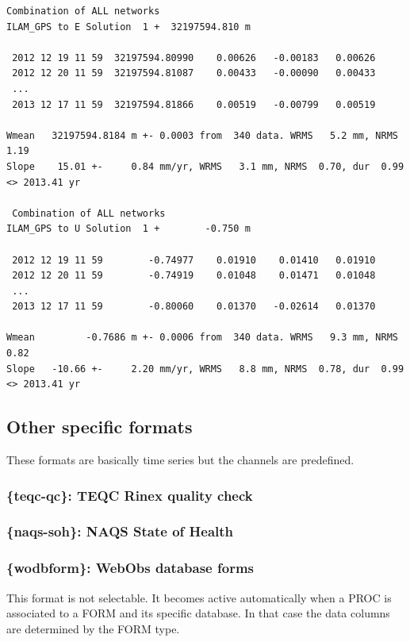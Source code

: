 \begin{lstlisting}[language={},title=GAMIT-GLOBK VAL format example]
 Combination of ALL networks
ILAM_GPS to E Solution  1 +  32197594.810 m

 2012 12 19 11 59  32197594.80990    0.00626   -0.00183   0.00626
 2012 12 20 11 59  32197594.81087    0.00433   -0.00090   0.00433
 ...
 2013 12 17 11 59  32197594.81866    0.00519   -0.00799   0.00519

Wmean   32197594.8184 m +- 0.0003 from  340 data. WRMS   5.2 mm, NRMS  1.19
Slope    15.01 +-     0.84 mm/yr, WRMS   3.1 mm, NRMS  0.70, dur  0.99 <> 2013.41 yr

 Combination of ALL networks
ILAM_GPS to U Solution  1 +        -0.750 m

 2012 12 19 11 59        -0.74977    0.01910    0.01410   0.01910
 2012 12 20 11 59        -0.74919    0.01048    0.01471   0.01048
 ...
 2013 12 17 11 59        -0.80060    0.01370   -0.02614   0.01370

Wmean         -0.7686 m +- 0.0006 from  340 data. WRMS   9.3 mm, NRMS  0.82
Slope   -10.66 +-     2.20 mm/yr, WRMS   8.8 mm, NRMS  0.78, dur  0.99 <> 2013.41 yr
\end{lstlisting}


\subsection{Other specific formats}

These formats are basically time series but the channels are predefined.

\subsubsection{\{teqc-qc\}: TEQC Rinex quality check}

\subsubsection{\{naqs-soh\}: NAQS State of Health}

\subsubsection{\{wodbform\}: WebObs database forms}

This format is not selectable. It becomes active automatically when a PROC is associated to a FORM and its specific database. In that case the data columns are determined by the FORM type.
